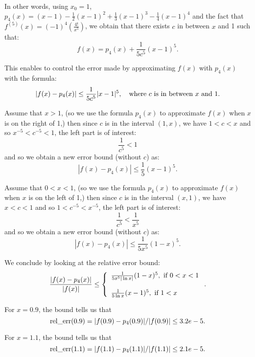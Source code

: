 \documentclass[pdftex,11pt]{article}
\begin{document}
\begin{enumerate}
                    In other words, using $x_0=1$, $p_4(x) = (x-1)
                    -\frac{1}{2} (x-1)^2 + \frac{1}{3} (x-1)^3 - \frac{1}{4}
                    (x-1)^4$ and the fact that $f^{(5)}(x) = (-1)^4
                    \left( \frac{4!}{x^5} \right)$, we obtain that
                    there exists $c$ in between $x$ and 1 such that:
                    \[ f(x) = p_4(x) + \frac{1}{5c^5} (x-1)^5.\]

                    This enables to control the error made by approximating $f(x)$ with $p_4(x)$ with the formula:
                    \[ | f(x) -  p_4(x) | \leq  \frac{1}{5c^5} |x-1|^5, \quad \textmd{where }c\textmd{ is in between }x\textmd{ and 1}.\]

                    Assume that $x>1$, (so we use the formula $p_4(x)$ to approximate $f(x)$ when $x$ is on the right of 1,) then
                    since $c$ is in the interval $(1,x)$, we have $1<c<x$  and so $x^{-5}<c^{-5}<1$, the left part is of interest:
                    \[\frac{1}{c^5} < 1 \]
                    and so we obtain a new error bound (without $c$) as:
                    \[ | f(x) -  p_4(x) | \leq  \frac{1}{5} (x-1)^5.\]

                    Assume that $0<x<1$, (so we use the formula $p_4(x)$ to approximate $f(x)$ when $x$ is on the left of 1,) then
                    since $c$ is in the interval $(x,1)$, we have $x<c<1$  and so $1<c^{-5}<x^{-5}$,  the left part is of interest:
                    \[\frac{1}{c^5} < \frac{1}{x^5} \]
                    and so we obtain a new error bound (without $c$) as:
                    \[ | f(x) -  p_4(x) | \leq  \frac{1}{5x^5}(1-x)^5.\]

                    We conclude by looking at the relative error bound:
                    \[ \frac{| f(x) -  p_4(x) |}{|f(x)|} \leq  \left\{ \begin{array}{l}  \frac{1}{5x^5|\ln{x}|}(1-x)^5, \textmd{ if }0<x < 1\\  ~\\ \frac{1}{5\ln{x}} (x-1)^5, \textmd{ if }1 <  x \end{array}\right..\]

                    For $x=0.9$, the bound tells us that
                    \[ \textmd{rel\_err}(0.9) = | f(0.9) -  p_4(0.9) |/|f(0.9)|  \leq 3.2e-5.\]

                    For $x=1.1$, the bound tells us that
                    \[ \textmd{rel\_err}(1.1) = | f(1.1) -  p_4(1.1) |/|f(1.1)|  \leq 2.1e-5.\]


\end{enumerate}
\end{document}
